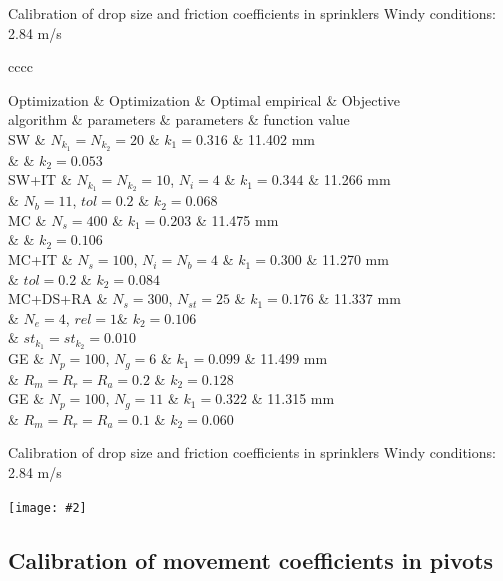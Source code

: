 \documentclass[10pt]{beamer}
\newcommand{\FIGURE}[2]
{
	\begin{center}
		\texttt{[image: \#2]}
	\end{center}
}
\newcommand{\TABLE}[3]
{
	\begin{table}[ht!]
		\centering
		#1
		\tabulinesep=0.9mm
		\begin{tabu}{#2}
			#3
		\end{tabu}
	\end{table}
}
\begin{document}
\begin{frame}{Calibration of drop size and friction coefficients in sprinklers}
{Windy conditions: 2.84 m/s}
\TABLE{\tiny}{cccc}
{
	Optimization & Optimization & Optimal empirical & Objective
	\\ algorithm & parameters & parameters & function value
	\\ \hline
	SW & $N_{k_1}=N_{k_2}=20$ & $k_1=0.316$ & 11.402 mm
	\\ & & $k_2=0.053$
	\\ \hline
	SW+IT & $N_{k_1}=N_{k_2}=10$, $N_i=4$ & $k_1=0.344$ & 11.266 mm
	\\ & $N_b=11$, $tol=0.2$ & $k_2=0.068$
	\\ \hline
	MC & $N_s=400$ & $k_1=0.203$ & 11.475 mm
	\\ & & $k_2=0.106$
	\\ \hline
	MC+IT & $N_s=100$, $N_i=N_b=4$ & $k_1=0.300$ & 11.270 mm
	\\ & $tol=0.2$ & $k_2=0.084$
	\\ \hline
	MC+DS+RA & $N_s=300$, $N_{st}=25$ & $k_1=0.176$ & 11.337 mm
	\\ & $N_e=4$, $rel=1$& $k_2=0.106$
	\\ & $st_{k_1}=st_{k_2}=0.010$
	\\ \hline
	GE & $N_p=100$, $N_g=6$ & $k_1=0.099$ & 11.499 mm
	\\ & $R_m=R_r=R_a=0.2$ & $k_2=0.128$
	\\ \hline
	GE & $N_p=100$, $N_g=11$ & $k_1=0.322$ & 11.315 mm
	\\ & $R_m=R_r=R_a=0.1$ & $k_2=0.060$
	\\ \hline
}
\end{frame}

\begin{frame}{Calibration of drop size and friction coefficients in sprinklers}
{Windy conditions: 2.84 m/s}
\FIGURE{width=\textwidth}{sprinkler-2,84.eps}
\end{frame}

\subsection{Calibration of movement coefficients in pivots}
\end{document}
